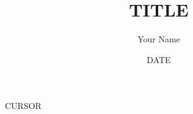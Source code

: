 \documentclass[12pt]{article}
\title{{{TITLE}}}
\author{Your Name}
\date{{{DATE}}}
\begin{document}
\maketitle

{{CURSOR}}
\end{document}
